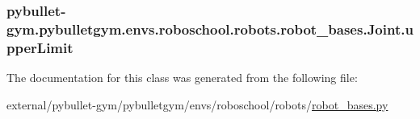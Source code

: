 \subsubsection[{\texorpdfstring{upper\+Limit}{upperLimit}}]{\setlength{\rightskip}{0pt plus 5cm}pybullet-\/gym.\+pybulletgym.\+envs.\+roboschool.\+robots.\+robot\+\_\+bases.\+Joint.\+upper\+Limit}\hypertarget{classpybullet-gym_1_1pybulletgym_1_1envs_1_1roboschool_1_1robots_1_1robot__bases_1_1_joint_ae8b82d9114b7fc61cd1fc55fee2f8f94}{}\label{classpybullet-gym_1_1pybulletgym_1_1envs_1_1roboschool_1_1robots_1_1robot__bases_1_1_joint_ae8b82d9114b7fc61cd1fc55fee2f8f94}


The documentation for this class was generated from the following file\+:\begin{DoxyCompactItemize}
\item 
external/pybullet-\/gym/pybulletgym/envs/roboschool/robots/\hyperlink{roboschool_2robots_2robot__bases_8py}{robot\+\_\+bases.\+py}\end{DoxyCompactItemize}
